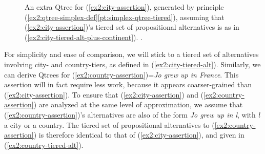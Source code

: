 \begin{exe}
	\label{ex2:city-tiered-alt-plus-continent}
\end{exe} 

\begin{figure}[H]
	\centering
	\caption{An extra Qtree for (\ref{ex2:city-assertion}), generated by principle (\ref{ex2:qtree-simplex-def}\ref{pt:simplex-qtree-tiered}), assuming that (\ref{ex2:city-assertion})'s tiered set of propositional alternatives is as in (\ref{ex2:city-tiered-alt-plus-continent}). .}\label{fig2:city-qtree-tiered-plus-continent}
\end{figure}

For simplicity and ease of comparison, we will stick to a tiered set of alternatives involving city- and country-tiers, as defined in (\ref{ex2:city-tiered-alt}). Similarly, we can derive Qtrees for (\ref{ex2:country-assertion})=\textit{Jo grew up in France}. This assertion will in fact require less work, because it appears coarser-grained than (\ref{ex2:city-assertion}). To ensure that (\ref{ex2:city-assertion}) and (\ref{ex2:country-assertion}) are analyzed at the same level of approximation, we assume that (\ref{ex2:country-assertion})'s alternatives are also of the form \textit{Jo grew up in l}, with \textit{l} a city or a country. The tiered set of propositional alternatives to (\ref{ex2:country-assertion}) is therefore identical to that of (\ref{ex2:city-assertion}), and given in (\ref{ex2:country-tiered-alt}).

